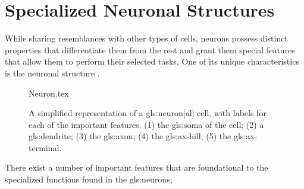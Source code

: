 \documentclass[class={myRUCProject}, crop=false]{standalone}
\begin{document}


\section{Specialized Neuronal Structures}

While sharing resemblances with other types of cells, neurons possess distinct properties that differentiate them from the rest and grant them special features that allow them to perform their selected tasks. One of its unique characteristics is the neuronal structure \cite{lovinger2008communication}.

\begin{figure}[H]
    \centering
    {Neuron.tex}
    \caption{A simplified representation of a \gls{gls:neuron}[al] cell, with labels for each of the important features. (1) the \gls{gls:soma} of the cell; (2) a \gls{gls:dendrite}; (3) the \gls{gls:axon}; (4) the \gls{gls:ax-hill}; (5) the \gls{gls:ax-terminal}.}\label{fig:Neuron}
\end{figure}

There exist a number of important features that are foundational to the specialized functions found in the \glspl{gls:neuron};
\end{document}
